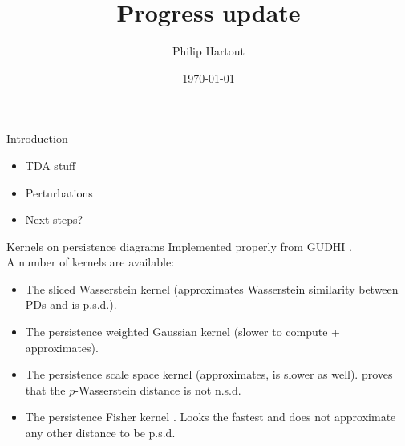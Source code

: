 \documentclass[aspectratio=169, 10pt, dvipsnames, handout]{beamer}
\title{Progress update}
\date{\today}
\author{Philip Hartout}
\begin{document}
\maketitle

\begin{frame}[fragile]{Introduction}
  \begin{itemize}
  \item TDA stuff
  \item Perturbations
  \item Next steps?
  \end{itemize}
\end{frame}

\begin{frame}[fragile]{Kernels on persistence diagrams}
  Implemented properly from GUDHI \cite{gudhi:PersistenceRepresentations}.\\
  A number of kernels are available:
  \begin{itemize}
  \item The sliced Wasserstein kernel (approximates Wasserstein similarity between
    PDs and is p.s.d.). \cite{carriere2017sliced}
  \item The persistence weighted Gaussian kernel (slower to compute + approximates).
    \cite{kusano2016persistence}
  \item The persistence scale space kernel \cite{reininghaus2015stable}
    (approximates, is slower as well). \cite{reininghaus2015stable} proves that the
    $p$-Wasserstein distance is not n.s.d.
  \item The persistence Fisher kernel \cite{le2018persistence}. Looks the
fastest and does not approximate any other distance to be p.s.d.
  \end{itemize}
\end{frame}
\end{document}
